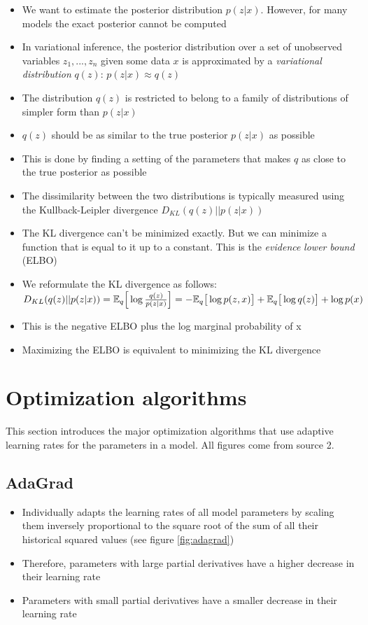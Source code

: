 \documentclass[]{article}
\begin{document}
\begin{itemize}
\begin{enumerate}
        \end{enumerate}
	\item We want to estimate the posterior distribution $p(z|x)$. However, for many models the exact posterior cannot be computed
    \item In variational inference, the posterior distribution over a set of unobserved variables $z_1, ..., z_n$ given some data $x$ is approximated by a \textit{variational} \textit{distribution} $q(z)$: $p(z|x) \approx q(z)$ 
    \item The distribution $q(z)$ is restricted to belong to a family of distributions of simpler form than $p(z|x)$
    \item $q(z)$ should be as similar to the true posterior $p(z|x)$ as possible
    \item This is done by finding a setting of the parameters that makes $q$ as close to the true posterior as possible
    \item The dissimilarity between the two distributions is typically measured using the Kullback-Leipler divergence $D_{KL}(q(z)||p(z|x))$
    \item The KL divergence can't be minimized exactly. But we can minimize a function that is equal to it up to a constant. This is the \textit{evidence} \textit{lower} \textit{bound}  (ELBO)
   \item We reformulate the KL divergence as follows:\\
    $D_{KL}(q(z)||p(z|x)) = \mathbb{E}_q \Big[ \log \frac{q(z)}{p(z|x)} \Big] \\ = -\mathbb{E}_q \big[ \log p(z,x) \big] + \mathbb{E}_q \big[\log q(z) \big] + \log p(x) $
   \item  This is the negative ELBO plus the log marginal probability of x
   \item Maximizing the ELBO is equivalent to minimizing the KL divergence

\end{itemize}


\section{Optimization algorithms}

This section introduces the major optimization algorithms that use adaptive learning rates for the parameters in a model. All figures come from source 2.

\subsection{AdaGrad}
\begin{itemize}
	\item Individually adapts the learning rates of all model parameters by scaling them inversely proportional to the square root of the sum of all their historical squared values (see figure \ref{fig:adagrad})
	\item Therefore, parameters with large partial derivatives have a higher decrease in their learning rate
	\item Parameters with small partial derivatives have a smaller decrease in their learning rate
\end{itemize}
\end{document}
